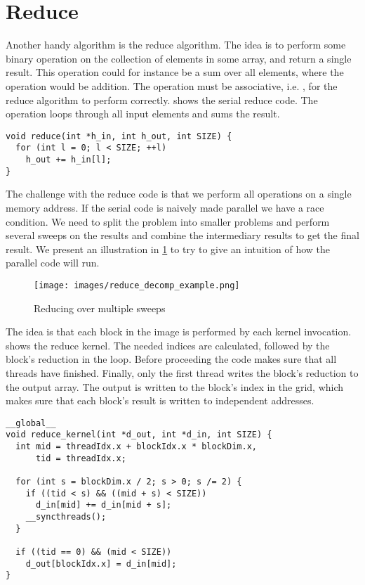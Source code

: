 \section{Reduce}
\label{sec:reduce}

Another handy algorithm is the reduce algorithm.
The idea is to perform some binary operation on the collection of elements in some array, and return a single result.
This operation could for instance be a sum over all elements, where the operation would be addition.
The operation must be associative, i.e. , for the reduce algorithm to perform correctly.
 shows the serial reduce code.
The operation loops through all input elements and sums the result.

\begin{lstlisting}[caption={Serial reduce}, label={lst:reduce seq}]
void reduce(int *h_in, int h_out, int SIZE) {
  for (int l = 0; l < SIZE; ++l) 
    h_out += h_in[l];
}
\end{lstlisting}

The challenge with the reduce code is that we perform all operations on a single memory address.
If the serial code is naively made parallel we have a race condition.
We need to split the problem into smaller problems and perform several sweeps on the results and combine the intermediary results to get the final result.
We present an illustration in \cref{fig:reduce decomp example} to try to give an intuition of how the parallel code will run.~\cite{reduceharris}

\begin{figure}[htb]
  \centering
  \texttt{[image: images/reduce\_decomp\_example.png]}
  \caption{Reducing over multiple sweeps}
  \label{fig:reduce decomp example}
\end{figure}

The idea is that each block in the image is performed by each kernel invocation.
 shows the reduce kernel.
The needed indices are calculated, followed by the block's reduction in the loop.
Before proceeding the code makes sure that all threads have finished.
Finally, only the first thread writes the block's reduction to the output array.
The output is written to the block's index in the grid, which makes sure that each block's result is written to independent addresses.

\begin{lstlisting}[caption={Reduce kernel}, label={lst:reduce par}]
__global__
void reduce_kernel(int *d_out, int *d_in, int SIZE) {
  int mid = threadIdx.x + blockIdx.x * blockDim.x,
      tid = threadIdx.x;

  for (int s = blockDim.x / 2; s > 0; s /= 2) {
    if ((tid < s) && ((mid + s) < SIZE))
      d_in[mid] += d_in[mid + s];
    __syncthreads();
  }

  if ((tid == 0) && (mid < SIZE))
    d_out[blockIdx.x] = d_in[mid];
}
\end{lstlisting}

